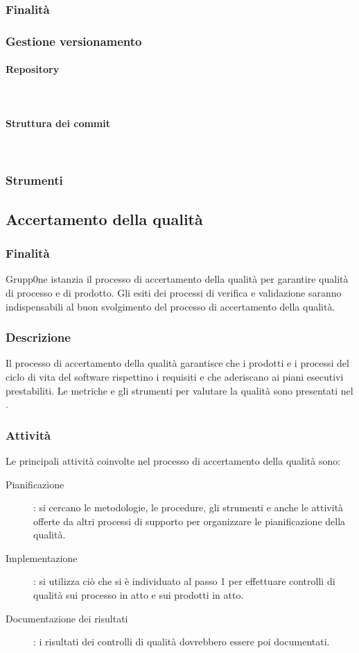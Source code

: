 \documentclass[../norme-di-progetto.tex]{subfiles}
\begin{document}
\subsubsection{Finalità}
\label{subs:finalita}
\subsubsection{Gestione versionamento}
\label{subs:gestione versionamento}
\paragraph{Repository}\mbox{}\\
\label{par:repository}
\paragraph{Struttura dei commit}\mbox{}\\
\label{par:struttura dei commit}
\subsubsection{Strumenti}
\label{subs:strumenti}
\subsection{Accertamento della qualità}
\subsubsection{Finalità}
\label{subs:finalita}
Grupp0ne istanzia il processo di accertamento della qualità per garantire qualità di processo e di prodotto. Gli esiti dei processi di verifica e validazione saranno indispensabili al buon svolgimento del processo di accertamento della qualità.
\subsubsection{Descrizione}
\label{subs:descrizione}
Il processo di accertamento della qualità garantisce che i prodotti e i processi del ciclo di vita del software rispettino i requisiti e che aderiscano ai piani esecutivi prestabiliti. Le metriche e gli strumenti per valutare la qualità sono presentati nel .
\subsubsection{Attività}
\label{subs:attivita}
Le principali attività coinvolte nel processo di accertamento della qualità sono:
\begin{description}
	\item [Pianificazione]: si cercano le metodologie, le procedure, gli strumenti e anche le attività offerte da altri processi di supporto per organizzare le pianificazione della qualità.
	\item [Implementazione]: si utilizza ciò che si è individuato al passo 1 per effettuare controlli di qualità sui processo in atto e sui prodotti in atto.
	\item [Documentazione dei risultati]: i risultati dei controlli di qualità dovrebbero essere poi documentati.
\end{description}
\end{document}
